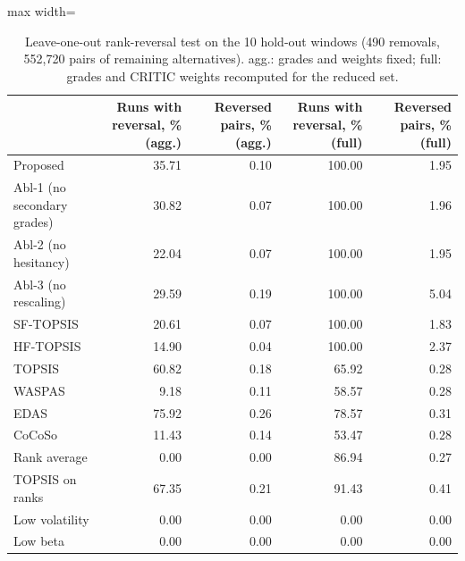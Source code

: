 \begin{table}[!htbp]
\centering
\footnotesize
\caption{Leave-one-out rank-reversal test on the 10 hold-out windows (490 removals, 552,720 pairs of remaining alternatives). agg.: grades and weights fixed; full: grades and CRITIC weights recomputed for the reduced set.}\label{tab:rr}
\begin{adjustbox}{max width=\textwidth}
\begin{tabular}{lrrrr}
\toprule
 & Runs with reversal, \% (agg.) & Reversed pairs, \% (agg.) & Runs with reversal, \% (full) & Reversed pairs, \% (full) \\
\midrule
Proposed & 35.71 & 0.10 & 100.00 & 1.95 \\
Abl-1 (no secondary grades) & 30.82 & 0.07 & 100.00 & 1.96 \\
Abl-2 (no hesitancy) & 22.04 & 0.07 & 100.00 & 1.95 \\
Abl-3 (no rescaling) & 29.59 & 0.19 & 100.00 & 5.04 \\
SF-TOPSIS & 20.61 & 0.07 & 100.00 & 1.83 \\
HF-TOPSIS & 14.90 & 0.04 & 100.00 & 2.37 \\
TOPSIS & 60.82 & 0.18 & 65.92 & 0.28 \\
WASPAS & 9.18 & 0.11 & 58.57 & 0.28 \\
EDAS & 75.92 & 0.26 & 78.57 & 0.31 \\
CoCoSo & 11.43 & 0.14 & 53.47 & 0.28 \\
Rank average & 0.00 & 0.00 & 86.94 & 0.27 \\
TOPSIS on ranks & 67.35 & 0.21 & 91.43 & 0.41 \\
Low volatility & 0.00 & 0.00 & 0.00 & 0.00 \\
Low beta & 0.00 & 0.00 & 0.00 & 0.00 \\
\bottomrule
\end{tabular}
\end{adjustbox}
\end{table}

